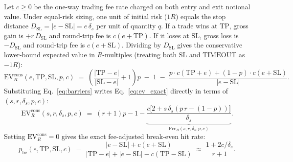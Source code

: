 \documentclass{article}
\newcommand{\EVR}{\mathrm{EV}_R}
\newcommand{\FeeR}{\mathrm{Fee}_R}
\newcommand{\TP}{\mathrm{TP}}
\newcommand{\SL}{\mathrm{SL}}
\begin{document}
Let $c \ge 0$ be the one-way trading fee rate charged on both entry and exit notional value. Under equal-risk sizing, one unit of initial risk ($1R$) equals the stop distance $D_{\SL} = |e - \SL| = e\,\delta_s$ per unit of quantity $q$. If a trade wins at $\TP$, gross gain is $+r\,D_{\SL}$ and round-trip fee is $c(e + \TP)$. If it loses at $\SL$, gross loss is $-D_{\SL}$ and round-trip fee is $c(e + \SL)$. Dividing by $D_{\SL}$ gives the conservative lower-bound expected value in $R$-multiples (treating both $\SL$ and $\mathrm{TIMEOUT}$ as $-1R$):
\begin{equation}
  \EVR^{\mathrm{cons}}(e, \TP, \SL, p, c)
  \;=\; \left(\frac{|\TP - e|}{|\SL - e|} + 1\right) p \;-\; 1
  \;-\; \frac{p \cdot c(\TP + e) + (1 - p) \cdot c(e + \SL)}{|e - \SL|}.
  \label{eq:ev_exact}
\end{equation}
Substituting Eq.~\eqref{eq:barriers} writes Eq.~\eqref{eq:ev_exact} directly in terms of $(s, r, \delta_s, p, c)$:
\begin{equation}
  \EVR^{\mathrm{cons}}(s, r, \delta_s, p, c)
  \;=\; (r + 1)p - 1 - \underbrace{\frac{c\bigl[2 + s\,\delta_s(p\,r - (1-p))\bigr]}{\delta_s}}_{\FeeR(s, r, \delta_s, p, c)}.
  \label{eq:ev_simplified}
\end{equation}
Setting $\EVR^{\mathrm{cons}} = 0$ gives the exact fee-adjusted break-even hit rate:
\begin{equation}
  p_{\mathrm{be}}(e, \TP, \SL, c)
  \;=\; \frac{|e - \SL| + c(e + \SL)}{|\TP - e| + |e - \SL| - c(\TP - \SL)}
  \;\approx\; \frac{1 + 2c/\delta_s}{r + 1}.
  \label{eq:p_be}
\end{equation}
\end{document}
